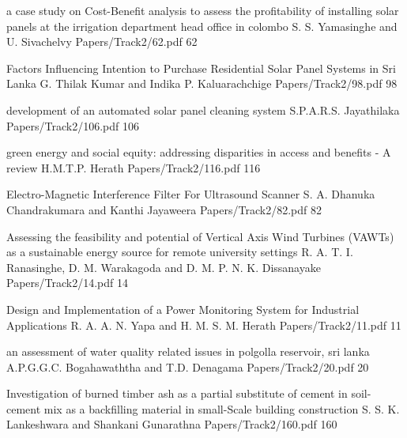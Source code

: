 




\addpaper
{a case study on Cost-Benefit analysis to assess the profitability of installing solar panels at the irrigation department head office in colombo}
{S. S. Yamasinghe and U. Sivachelvy}
{Papers/Track2/62.pdf}
{62}


\addpaper
{Factors Influencing Intention to Purchase Residential Solar Panel Systems in Sri Lanka}
{G. Thilak Kumar and Indika P. Kaluarachchige}
{Papers/Track2/98.pdf}
{98}


     \addpaper
 	{development of an automated solar panel cleaning system}
		 {S.P.A.R.S. Jayathilaka} 
		 {Papers/Track2/106.pdf}
     {106} 


     \addpaper
 	{green energy and social equity: addressing disparities in access and benefits - A review}
		 {H.M.T.P. Herath} 
		 {Papers/Track2/116.pdf}
     {116} 


     \addpaper
 	{Electro-Magnetic Interference Filter For Ultrasound Scanner}
		 {S. A. Dhanuka Chandrakumara and Kanthi Jayaweera} 
		 {Papers/Track2/82.pdf}
     {82} 



     \addpaper
 	{Assessing the feasibility and potential of Vertical Axis Wind Turbines (VAWTs) as a sustainable energy source for remote university settings}
		 {R. A. T. I. Ranasinghe, D. M. Warakagoda and D. M. P. N. K. Dissanayake} 
		 {Papers/Track2/14.pdf}
     {14} 
     

     \addpaper
 	{Design and Implementation of a Power Monitoring System for Industrial Applications}
		 {R. A. A. N. Yapa and H. M. S. M. Herath} 
		 {Papers/Track2/11.pdf}
     {11} 



\addpaper
{an assessment of water quality related issues in polgolla reservoir, sri lanka}
{A.P.G.G.C. Bogahawaththa and T.D. Denagama}
{Papers/Track2/20.pdf}
{20}


\addpaper
{Investigation of burned timber ash as a partial substitute of cement in soil-cement mix as a backfilling material in small-Scale building construction}
{S. S. K. Lankeshwara and Shankani Gunarathna}
{Papers/Track2/160.pdf}
{160}



